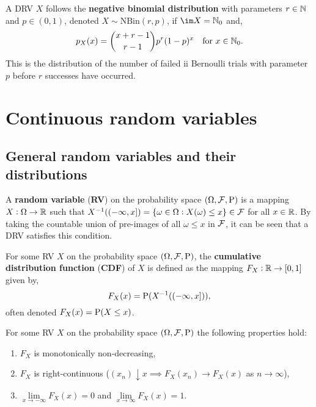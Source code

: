 \documentclass[../Year1/Year1.tex]{subfiles}
\begin{document}
\begin{definition}
    A DRV $X$ follows the \textbf{negative binomial distribution} with parameters $r\in\NN$ and $p \in (0,1)$, denoted $X \sim \text{NBin}(r,p)$, if $\im X = \NN_0$ and, \[
        p_X(x) = \binom{x+r-1}{r-1}p^r(1-p)^x \quad \text{\textcolor{black}{for }$x\in\NN_0$}\textcolor{black}{.}
    \]
This is the distribution of the number of failed ii Bernoulli trials with parameter $p$ before $r$ successes have occurred.
\end{definition}

\section{Continuous random variables}

\subsection{General random variables and their distributions}
\begin{definition}
    A \textbf{random variable} (\textbf{RV}) on the probability space $(\Omega,\FFF,\P)$ is a mapping $X:\Omega\rightarrow\RR$ such that $X^{-1}((-\infty,x]) = \{\omega\in\Omega:X(\omega)\leq x\}\in\FFF$ for all $x\in\RR$. By taking the countable union of pre-images of all $\omega\leq x$ in $\FFF$, it can be seen that a DRV satisfies this condition.
\end{definition}

\begin{definition}
    For some RV $X$ on the probability space $(\Omega,\FFF,\P)$, the \textbf{cumulative distribution function} (\textbf{CDF}) of $X$ is defined as the mapping $F_X:\RR\rightarrow[0,1]$ given by, \[
        F_X(x) = \P(X^{-1}((-\infty,x]))\textcolor{black}{,}
    \]
    often denoted $F_X(x)=\P(X\leq x)$.
\end{definition}

\begin{theorem}
    For some RV $X$ on the probability space $(\Omega,\FFF,\P)$ the following properties hold:
    \begin{enumerate}
        \item $F_X$ is monotonically non-decreasing,
        \item $F_X$ is right-continuous ($(x_n)\downarrow x \implies F_X(x_n)\rightarrow F_X(x)$ as $n\rightarrow\infty$),
        \item $\lim\limits_{x\rightarrow -\infty}F_X(x) = 0$ and $\lim\limits_{x\rightarrow \infty}F_X(x) = 1$.
    \end{enumerate}
\end{theorem}
\end{document}
